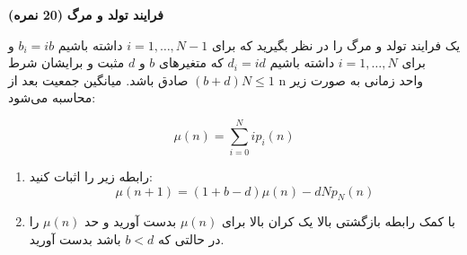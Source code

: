\Large \textbf{فرایند تولد و مرگ}
\large \textbf{(20 نمره)}

\normalsize \vspace{0.5cm}

یک فرایند تولد و مرگ را در نظر بگیرید که برای
$i = 1, \ldots ,N - 1$
داشته باشیم
${b_i} = ib$
و برای 
$i = 1, \ldots ,N$
داشته باشیم
${d_i} = id$
که
متغیرهای $b$ و $d$ مثبت و برایشان شرط
$\left( {b + d} \right)N \le 1$
صادق باشد.
میانگین جمعیت بعد از n واحد زمانی به صورت زیر محاسبه می‌شود:

$$
\mu \left( n \right) = \sum\limits_{i = 0}^N {i{p_i}\left( n \right)} 
$$



\begin{enumerate}[label=(\alph*)]
	
	\item
	رابطه زیر را اثبات کنید:
	$$
	\mu \left( {n + 1} \right) = (1 + b - d)\mu \left( n \right) - dN{p_N}\left( n \right)
	$$
	
	\item
	با کمک رابطه بازگشتی بالا یک کران بالا برای
	$\mu \left( n \right)$
	بدست آورید و حد 
	$\mu \left( n \right)$
	را در حالتی که
	$b < d$
	باشد بدست آورید.
	
\end{enumerate}